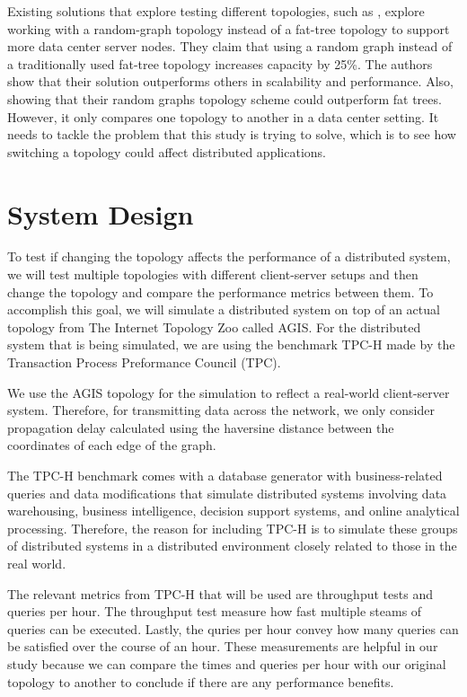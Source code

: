 Existing solutions that explore testing different topologies, such as \cite{singla2012jellyfish}, explore working with a random-graph topology instead of a fat-tree topology to support more data center server nodes. They claim that using a random graph instead of a traditionally used fat-tree topology increases capacity by 25\%. The authors show that their solution outperforms others in scalability and performance. Also, showing that their random graphs topology scheme could outperform fat trees. However, it only compares one topology to another in a data center setting. It needs to tackle the problem that this study is trying to solve, which is to see how switching a topology could affect distributed applications.



\section{System Design}

\indent To test if changing the topology affects the performance of a distributed system, we will test multiple topologies with different client-server setups and then change the topology and compare the performance metrics between them. To accomplish this goal, we will simulate a distributed system on top of an actual topology from The Internet Topology Zoo called AGIS. For the distributed system that is being simulated, we are using the benchmark TPC-H made by the Transaction Process Preformance Council (TPC).

	We use the AGIS topology for the simulation to reflect a real-world client-server system. Therefore, for transmitting data across the network, we only consider propagation delay calculated using the haversine distance between the coordinates of each edge of the graph.

The TPC-H benchmark comes with a database generator with business-related queries and data modifications that simulate distributed systems involving data warehousing, business intelligence, decision support systems, and online analytical processing. Therefore, the reason for including TPC-H is to simulate these groups of distributed systems in a distributed environment closely related to those in the real world.

	The relevant metrics from TPC-H that will be used are throughput tests and queries per hour. The throughput test measure how fast multiple steams of queries can be executed. Lastly, the quries per hour convey how many queries can be satisfied over the course of an hour. These measurements are helpful in our study because we can compare the times and queries per hour with our original topology to another to conclude if there are any performance benefits.

